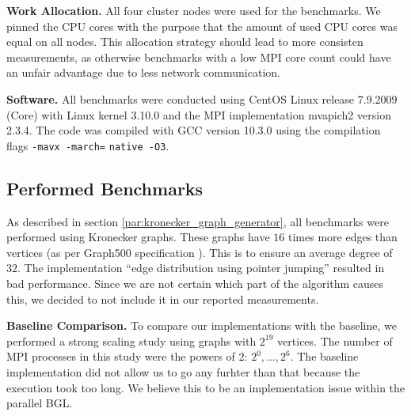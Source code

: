 \documentclass[letterpaper]{article}
\newcommand{\mypar}[1]{{\bf #1.}}
\begin{document}
\mypar{Work Allocation}
All four cluster nodes were used for the benchmarks. We pinned the CPU cores with the purpose that the amount of used
CPU cores was equal on all nodes. This allocation strategy should lead to more consisten measurements, as otherwise
benchmarks with a low MPI core count could have an unfair advantage due to less network communication.

\mypar{Software}
All benchmarks were conducted using CentOS Linux release 7.9.2009 (Core) with Linux kernel 3.10.0 and the MPI
implementation mvapich2 version 2.3.4. The code was compiled with GCC version 10.3.0 using the compilation flags
\lstinline[basicstyle=\ttfamily\color{black},identifierstyle=\color{black}]|-mavx -march=| \linebreak
\lstinline[basicstyle=\ttfamily\color{black},identifierstyle=\color{black}]|native -O3|.

\subsection{Performed Benchmarks}
As described in section \ref{par:kronecker_graph_generator}, all benchmarks were performed using Kronecker graphs. These
graphs have $16$ times more edges than vertices (as per Graph500 specification \cite{graph500}). This is to ensure an
average degree of $32$. The implementation ``edge distribution using pointer jumping'' resulted in bad performance.
Since we are not certain which part of the algorithm causes this, we decided to not include it in our reported
measurements. %

\mypar{Baseline Comparison}
To compare our implementations with the baseline, we performed a strong scaling study using graphs with $2^{19}$
vertices. The number of MPI processes in this study were the powers of $2$: $2^0, \dotsc, 2^6$. The baseline
implementation did not allow us to go any furhter than that because the execution took too long. We believe this to be
an implementation issue within the parallel BGL.
\end{document}
